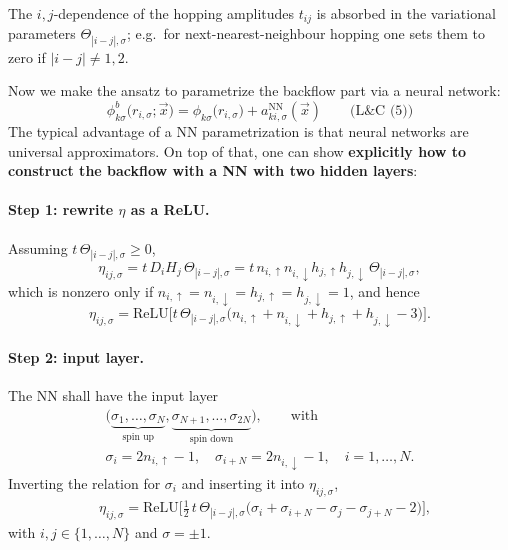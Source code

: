 \documentclass[../../main.tex]{subfiles}
\begin{document}
The $i,j$-dependence of the hopping amplitudes $t_{ij}$ is absorbed in the
variational parameters $\Theta_{|i-j|,\sigma}$; e.g.\ for next-nearest-neighbour
hopping one sets them to zero if $|i-j|\neq 1,2$.

Now we make the ansatz to parametrize the backflow part via a neural network:
\begin{equation}
\phi^b_{k\sigma}\big(r_{i,\sigma};\vec x\big)
=\phi_{k\sigma}\big(r_{i,\sigma}\big)+a^{\mathrm{NN}}_{k i,\sigma}(\vec x) \qquad \text{(L\&C (5))}
\end{equation}
The typical advantage of a NN parametrization is that neural networks are
universal approximators. On top of that, one can show \textbf{explicitly how to
construct the backflow with a NN with two hidden layers}:

\paragraph{Step 1: rewrite $\eta$ as a ReLU.}
Assuming $t\,\Theta_{|i-j|,\sigma}\ge0$,
\begin{equation*}
\eta_{ij,\sigma}=t\,D_iH_j\,\Theta_{|i-j|,\sigma}
=t\,n_{i,\uparrow}n_{i,\downarrow}h_{j,\uparrow}h_{j,\downarrow}\,\Theta_{|i-j|,\sigma},
\end{equation*}
which is nonzero only if
$n_{i,\uparrow}=n_{i,\downarrow}=h_{j,\uparrow}=h_{j,\downarrow}=1$, and hence
\begin{equation*}
\eta_{ij,\sigma}=\mathrm{ReLU}\Big[t\,\Theta_{|i-j|,\sigma}
\big(n_{i,\uparrow}+n_{i,\downarrow}+h_{j,\uparrow}+h_{j,\downarrow}-3\big)\Big].
\end{equation*}

\paragraph{Step 2: input layer.}
The NN shall have the input layer
\begin{align*}
\big(\underbrace{\sigma_1,\dots,\sigma_N}_{\text{spin up}},
\underbrace{\sigma_{N+1},\dots,\sigma_{2N}}_{\text{spin down}}\big),
\qquad \text{with} \\
\sigma_i=2n_{i,\uparrow}-1,\quad \sigma_{i+N}=2n_{i,\downarrow}-1,
\quad i=1,\dots,N .
\end{align*}
Inverting the relation for $\sigma_i$ and inserting it into $\eta_{ij,\sigma}$,
\begin{align*}
&\eta_{ij,\sigma}=\mathrm{ReLU}\Big[\tfrac{1}{2}\,t\,\Theta_{|i-j|,\sigma}
\big(\sigma_i+\sigma_{i+N}-\sigma_j-\sigma_{j+N}-2\big)\Big],  
\end{align*}
with $i,j\in\{1,\dots,N\}$ and $\sigma=\pm1$.
\end{document}
